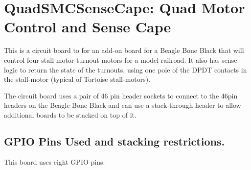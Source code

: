 %
%
%
%
% 
%
%
%
%
%
% 
%

\chapter{QuadSMCSenseCape: Quad Motor Control and Sense Cape}


This is a circuit board to for an add-on board for a Beagle Bone Black that
will control four stall-motor turnout motors for a model railroad. It also has
sense logic to return the state of the turnouts, using one pole of the DPDT
contacts in the stall-motor (typical of Tortoise stall-motors).

The circuit board uses a pair of 46 pin header sockets to connect to the 46pin
headers on the Beagle Bone Black and can use a stack-through header to allow
additional boards to be stacked on top of it.

\section{GPIO Pins Used and stacking restrictions.}

This board uses eight GPIO pins:


